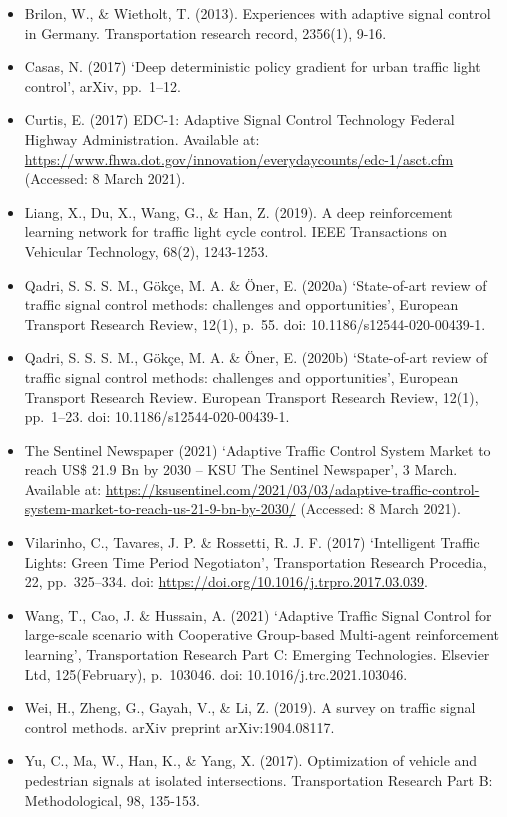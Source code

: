 \documentclass[
]{book}
\providecommand{\tightlist}{%
  \setlength{\itemsep}{0pt}\setlength{\parskip}{0pt}}
\begin{document}
\begin{itemize}
\tightlist
\item
  Brilon, W., \& Wietholt, T. (2013). Experiences with adaptive signal control in Germany. Transportation research record, 2356(1), 9-16.
\item
  Casas, N. (2017) `Deep deterministic policy gradient for urban traffic light control', arXiv, pp.~1--12.
\item
  Curtis, E. (2017) EDC-1: Adaptive Signal Control Technology \textbar{} Federal Highway Administration. Available at: \url{https://www.fhwa.dot.gov/innovation/everydaycounts/edc-1/asct.cfm} (Accessed: 8 March 2021).
\item
  Liang, X., Du, X., Wang, G., \& Han, Z. (2019). A deep reinforcement learning network for traffic light cycle control. IEEE Transactions on Vehicular Technology, 68(2), 1243-1253.
\item
  Qadri, S. S. S. M., Gökçe, M. A. \& Öner, E. (2020a) `State-of-art review of traffic signal control methods: challenges and opportunities', European Transport Research Review, 12(1), p.~55. doi: 10.1186/s12544-020-00439-1.
\item
  Qadri, S. S. S. M., Gökçe, M. A. \& Öner, E. (2020b) `State-of-art review of traffic signal control methods: challenges and opportunities', European Transport Research Review. European Transport Research Review, 12(1), pp.~1--23. doi: 10.1186/s12544-020-00439-1.
\item
  The Sentinel Newspaper (2021) `Adaptive Traffic Control System Market to reach US\$ 21.9 Bn by 2030 -- KSU \textbar{} The Sentinel Newspaper', 3 March. Available at: \url{https://ksusentinel.com/2021/03/03/adaptive-traffic-control-system-market-to-reach-us-21-9-bn-by-2030/} (Accessed: 8 March 2021).
\item
  Vilarinho, C., Tavares, J. P. \& Rossetti, R. J. F. (2017) `Intelligent Traffic Lights: Green Time Period Negotiaton', Transportation Research Procedia, 22, pp.~325--334. doi: \url{https://doi.org/10.1016/j.trpro.2017.03.039}.
\item
  Wang, T., Cao, J. \& Hussain, A. (2021) `Adaptive Traffic Signal Control for large-scale scenario with Cooperative Group-based Multi-agent reinforcement learning', Transportation Research Part C: Emerging Technologies. Elsevier Ltd, 125(February), p.~103046. doi: 10.1016/j.trc.2021.103046.
\item
  Wei, H., Zheng, G., Gayah, V., \& Li, Z. (2019). A survey on traffic signal control methods. arXiv preprint arXiv:1904.08117.
\item
  Yu, C., Ma, W., Han, K., \& Yang, X. (2017). Optimization of vehicle and pedestrian signals at isolated intersections. Transportation Research Part B: Methodological, 98, 135-153.
\end{itemize}
\end{document}
